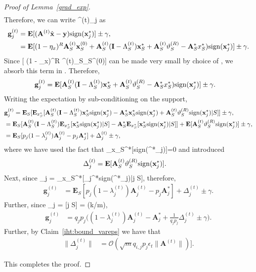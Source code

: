 \documentclass{article}
\newcommand{\sgn}{{\rm sign}}
\def\[#1\]{{$#1$}}
\def\b#1{{\mathbf{#1}}}
\begin{document}
\begin{proof}[Proof of Lemma~\ref{grad_exp}]
\begin{align*}
	
	\end{align*}
	Therefore, we can write \[	\b{g}^{(t)}_j \] as
	\begin{align*}
	\b{g}^{(t)}_j 
	&= \mathbf{E}[(\b{A}^{(t)}\hat{\b{x}} - \b{y})\sgn(\b{x}^*_j)]  \pm \gamma,\\
	&=\mathbf{E}[ (1 - \eta_{x})^{R} \b{A}^{(t)}_S\b{x}_{S}^{(0)} + \b{A}^{(t)}_S(\b{I} - \Lambda^{(t)}_S)\b{x}_S^* + \b{A}^{(t)}_S\vartheta^{(R)}_S - \b{A}^*_Sx^*_S)\sgn(\b{x}^*_j)]  \pm \gamma.
	
	\end{align*}
	Since \[\mathbf{E}[ (1 - \eta_{x})^{R} \b{A}^{(t)}_S\b{x}_{S}^{(0)}]\] can be made very small by choice of \[R\], we absorb this term in \[\gamma\]. Therefore, 
	\begin{align*}
	\b{g}^{(t)}_j 
	&=\mathbf{E}[ \b{A}^{(t)}_S(\b{I} - \Lambda^{(t)}_S)\b{x}_S^* + \b{A}^{(t)}_S\vartheta^{(R)}_S - \b{A}^*_Sx^*_S)\sgn(\b{x}^*_j)]  \pm \gamma.
	
	\end{align*}
	Writing the expectation by sub-conditioning on the support,
	\begin{align*}
	&\b{g}^{(t)}_j
	=\mathbf{E}_S[ \mathbf{E}_{x_S^*}[\b{A}^{(t)}_S(\b{I} - \Lambda^{(t)}_S)\b{x}_S^* \sgn(\b{x}^*_j) - \b{A}^*_S\b{x}_S^*\sgn(\b{x}^*_j) + \b{A}^{(t)}_S\vartheta^{(R)}_S\sgn(\b{x}^*_j) | S]]  \pm \gamma,\\
	&=\mathbf{E}_S[\b{A}^{(t)}_S(\b{I} - \Lambda^{(t)}_S)\mathbf{E}_{x_S^*}[\b{x}_S^*\sgn(\b{x}^*_j)|S] - \b{A}^*_S\mathbf{E}_{x_S^*}[\b{x}_S^*\sgn(\b{x}^*_j)|S]] + \mathbf{E}[\b{A}^{(t)}_S\vartheta^{(R)}_S\sgn(\b{x}^*_j)] \pm \gamma,\\
	&= \mathbf{E}_S[p_j(1 - \lambda^{(t)}_j)\b{A}^{(t)}_j - p_j\b{A}^*_j] + \Delta^{(t)}_j\pm \gamma,
	\end{align*}
	where we have used the fact that \[\mathbf{E}_{x_S^*}[\sgn(\b{x}^*_j)]=0\] and introduced 
	\begin{align*}
	\Delta^{(t)}_j &= \b{E}[\b{A}^{(t)}_S\vartheta^{(R)}_S\sgn(\b{x}^*_j)].
	\end{align*}
	Next, since \[ p_j = _{x_S^*}[\b{x}_j^*\sgn(\b{x}^*_j)|j \in S]\], therefore,
	\begin{align*}
	\b{g}^{(t)}_j
	&=\mathbf{E}_S[ p_j (1 - \lambda^{(t)}_j)\b{A}^{(t)}_j- p_j\b{A}^*_j] + \Delta^{(t)}_j\pm \gamma.
	\end{align*}
	Further, since \[q_j = \b{Pr}[j \in S] = (k/m)\], 
	\begin{align*}
	\b{g}^{(t)}_j
	&= q_j p_j \big((1 - \lambda^{(t)}_j)\b{A}^{(t)}_j- \b{A}^*_j + \tfrac{1}{q_j p_j}\Delta^{(t)}_j \pm \gamma\big).
	\end{align*}
	Further, by Claim~\ref{iht:bound_vareps} we have that 
	\begin{align*}
	\|\Delta^{(t)}_{j}\|&= \mathcal{O}(\sqrt{m}q_{i,j}p_{j}\epsilon_t\|\b{A}^{(t)}\|)].
	\end{align*}
	
    This completes the proof.
\end{proof}
\end{document}
